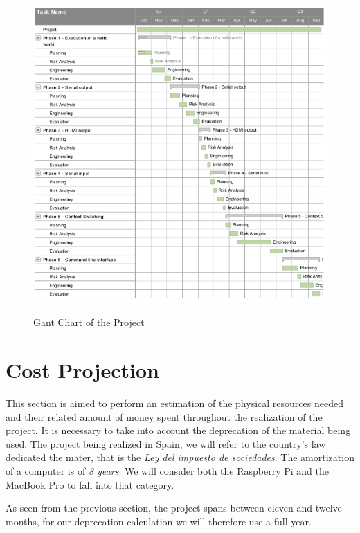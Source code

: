 \begin{figure}
\begin{center}
\includegraphics[width=1\textwidth]{includes/figures/chapter7_gant_diagram.png}  \\[0.5 cm]
\end{center}
\caption{Gant Chart of the Project}
\label{fig:chapter7_gant_diagram}
\end{figure}


\section{Cost Projection}

This section is aimed to perform an estimation of the physical resources needed and their related amount of money spent throughout the realization of the project. It is necessary to take into account the deprecation of the material being used. The project being realized in Spain, we will refer to the country's law dedicated the mater, that is the \textit{Ley del impuesto de sociedades}\cite{ley_impuesto_sobre_sociedades}. The amortization\cite{amortizacion_2015} of a computer is of \textit{8 years}. We will consider both the Raspberry Pi and the MacBook Pro to fall into that category.

As seen from the previous section, the project spans between eleven and twelve months, for our deprecation calculation we will therefore use a full year.

